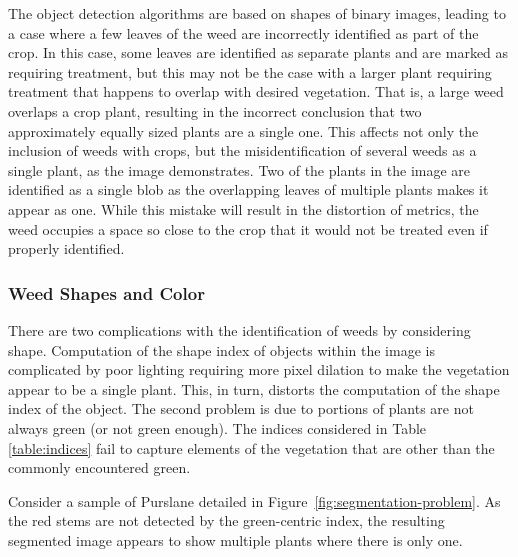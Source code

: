 \documentclass[letterpaper, notitlepage]{report}
\begin{document}
The object detection algorithms are based on shapes of binary images, leading to a case where a few leaves of the weed are incorrectly identified as part of the crop. In this case, some leaves are identified as separate plants and are marked as requiring treatment, but this may not be the case with a larger plant requiring treatment that happens to overlap with desired vegetation. That is, a large weed overlaps a crop plant, resulting in the incorrect conclusion that two approximately equally sized plants are a single one. This affects not only the inclusion of weeds with crops, but the misidentification of several weeds as a single plant, as the image demonstrates.  Two of the plants in the image are identified as a single blob as the overlapping leaves of multiple plants makes it appear as one. While this mistake will result in the distortion of metrics, the weed occupies a space so close to the crop that it would not be treated even if properly identified.

\subsubsection{Weed Shapes and Color}
There are two complications with the identification of weeds by considering shape.  Computation of the shape index of objects within the image is complicated by poor lighting requiring more pixel dilation to make the vegetation appear to be a single plant. This, in turn, distorts the computation of the shape index of the object. The second problem is due to portions of plants are not always green (or not green enough). The indices considered in Table \ref{table:indices} fail to capture elements of the vegetation that are other than the commonly encountered green.

Consider a sample of Purslane detailed in Figure~\ref{fig:segmentation-problem}. As the red stems are not detected by the green-centric index, the resulting segmented image appears to show multiple plants where there is only one.
\end{document}
